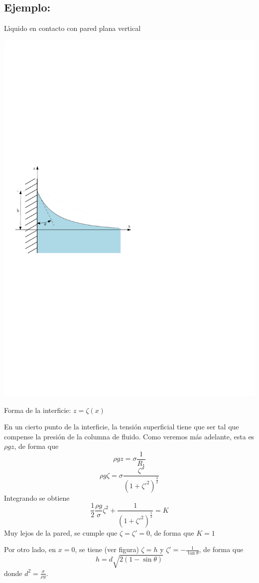 \subsection*{Ejemplo:}
L\'{\i}quido en contacto con pared plana vertical
\begin{center}
\includegraphics{TeX_files/chapter01-Introduccion/pared.pdf}
\end{center}
Forma de la interficie: $z=\zeta(x)$

En un cierto punto de la interficie, la tensi\'on superficial tiene que ser tal que compense la presi\'on de la columna de fluido. Como veremos m\'as adelante, esta es $\rho g z$, de forma que
$$
\rho g z = \sigma \frac{1}{R_1}
$$
$$
\rho g \zeta = \sigma \frac{\zeta''}{\left( 1 + \zeta'^2\right)^\frac{3}{2}}
$$
Integrando se obtiene
$$
\frac{1}{2}\frac{\rho g}{\sigma}\zeta^2 + \frac{1}{\left(1+\zeta'^2\right)^\frac{1}{2}} = K
$$
Muy lejos de la pared, se cumple que $\zeta=\zeta'=0$, de forma que $K = 1$

Por otro lado, en $x=0$, se tiene (ver figura) $\zeta=h$ y $\zeta'=-\frac{1}{\tan \theta}$, de forma que
$$
h = d \sqrt{2\left(1-\sin \theta \right)}
$$
donde $d^2=\frac{\sigma}{\rho g}$.